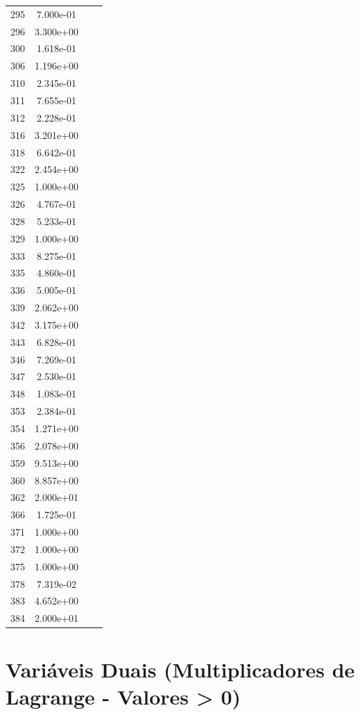 \documentclass[12pt]{article}
\begin{document}
\begin{longtable}{@{}cccc@{}}
295 & 7.000e-01 &  &  \\
296 & 3.300e+00 &  &  \\
300 & 1.618e-01 &  &  \\
306 & 1.196e+00 &  &  \\
310 & 2.345e-01 &  &  \\
311 & 7.655e-01 &  &  \\
312 & 2.228e-01 &  &  \\
316 & 3.201e+00 &  &  \\
318 & 6.642e-01 &  &  \\
322 & 2.454e+00 &  &  \\
325 & 1.000e+00 &  &  \\
326 & 4.767e-01 &  &  \\
328 & 5.233e-01 &  &  \\
329 & 1.000e+00 &  &  \\
333 & 8.275e-01 &  &  \\
335 & 4.860e-01 &  &  \\
336 & 5.005e-01 &  &  \\
339 & 2.062e+00 &  &  \\
342 & 3.175e+00 &  &  \\
343 & 6.828e-01 &  &  \\
346 & 7.269e-01 &  &  \\
347 & 2.530e-01 &  &  \\
348 & 1.083e-01 &  &  \\
353 & 2.384e-01 &  &  \\
354 & 1.271e+00 &  &  \\
356 & 2.078e+00 &  &  \\
359 & 9.513e+00 &  &  \\
360 & 8.857e+00 &  &  \\
362 & 2.000e+01 &  &  \\
366 & 1.725e-01 &  &  \\
371 & 1.000e+00 &  &  \\
372 & 1.000e+00 &  &  \\
375 & 1.000e+00 &  &  \\
378 & 7.319e-02 &  &  \\
383 & 4.652e+00 &  &  \\
384 & 2.000e+01 &  &  \\

\bottomrule
\end{longtable}


\section{Variáveis Duais (Multiplicadores de Lagrange - Valores > 0)}
\end{document}
